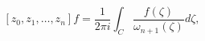 \[[z_{0},z_{1},\dots,z_{n}]f=\frac{1}{2\pi i}\int_{C}\frac{f(\zeta)}{\omega_{n+1%
}(\zeta)}d\zeta,\]